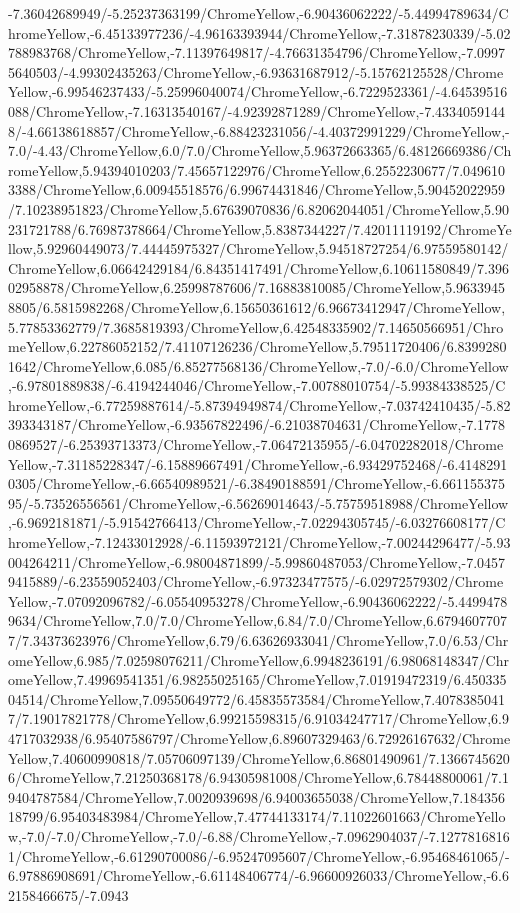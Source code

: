{\begin{tikzternal}
{-7.36042689949/-5.25237363199/ChromeYellow,-6.90436062222/-5.44994789634/ChromeYellow,-6.45133977236/-4.96163393944/ChromeYellow,-7.31878230339/-5.02788983768/ChromeYellow,-7.11397649817/-4.76631354796/ChromeYellow,-7.09975640503/-4.99302435263/ChromeYellow,-6.93631687912/-5.15762125528/ChromeYellow,-6.99546237433/-5.25996040074/ChromeYellow,-6.7229523361/-4.64539516088/ChromeYellow,-7.16313540167/-4.92392871289/ChromeYellow,-7.43340591448/-4.66138618857/ChromeYellow,-6.88423231056/-4.40372991229/ChromeYellow,-7.0/-4.43/ChromeYellow,6.0/7.0/ChromeYellow,5.96372663365/6.48126669386/ChromeYellow,5.94394010203/7.45657122976/ChromeYellow,6.2552230677/7.0496103388/ChromeYellow,6.00945518576/6.99674431846/ChromeYellow,5.90452022959/7.10238951823/ChromeYellow,5.67639070836/6.82062044051/ChromeYellow,5.90231721788/6.76987378664/ChromeYellow,5.8387344227/7.42011119192/ChromeYellow,5.92960449073/7.44445975327/ChromeYellow,5.94518727254/6.97559580142/ChromeYellow,6.06642429184/6.84351417491/ChromeYellow,6.10611580849/7.39602958878/ChromeYellow,6.25998787606/7.16883810085/ChromeYellow,5.96339458805/6.5815982268/ChromeYellow,6.15650361612/6.96673412947/ChromeYellow,5.77853362779/7.3685819393/ChromeYellow,6.42548335902/7.14650566951/ChromeYellow,6.22786052152/7.41107126236/ChromeYellow,5.79511720406/6.83992801642/ChromeYellow,6.085/6.85277568136/ChromeYellow,-7.0/-6.0/ChromeYellow,-6.97801889838/-6.4194244046/ChromeYellow,-7.00788010754/-5.99384338525/ChromeYellow,-6.77259887614/-5.87394949874/ChromeYellow,-7.03742410435/-5.82393343187/ChromeYellow,-6.93567822496/-6.21038704631/ChromeYellow,-7.17780869527/-6.25393713373/ChromeYellow,-7.06472135955/-6.04702282018/ChromeYellow,-7.31185228347/-6.15889667491/ChromeYellow,-6.93429752468/-6.41482910305/ChromeYellow,-6.66540989521/-6.38490188591/ChromeYellow,-6.66115537595/-5.73526556561/ChromeYellow,-6.56269014643/-5.75759518988/ChromeYellow,-6.9692181871/-5.91542766413/ChromeYellow,-7.02294305745/-6.03276608177/ChromeYellow,-7.12433012928/-6.11593972121/ChromeYellow,-7.00244296477/-5.93004264211/ChromeYellow,-6.98004871899/-5.99860487053/ChromeYellow,-7.04579415889/-6.23559052403/ChromeYellow,-6.97323477575/-6.02972579302/ChromeYellow,-7.07092096782/-6.05540953278/ChromeYellow,-6.90436062222/-5.44994789634/ChromeYellow,7.0/7.0/ChromeYellow,6.84/7.0/ChromeYellow,6.67946077077/7.34373623976/ChromeYellow,6.79/6.63626933041/ChromeYellow,7.0/6.53/ChromeYellow,6.985/7.02598076211/ChromeYellow,6.9948236191/6.98068148347/ChromeYellow,7.49969541351/6.98255025165/ChromeYellow,7.01919472319/6.45033504514/ChromeYellow,7.09550649772/6.45835573584/ChromeYellow,7.40783850417/7.19017821778/ChromeYellow,6.99215598315/6.91034247717/ChromeYellow,6.94717032938/6.95407586797/ChromeYellow,6.89607329463/6.72926167632/ChromeYellow,7.40600990818/7.05706097139/ChromeYellow,6.86801490961/7.13667456206/ChromeYellow,7.21250368178/6.94305981008/ChromeYellow,6.78448800061/7.19404787584/ChromeYellow,7.0020939698/6.94003655038/ChromeYellow,7.18435618799/6.95403483984/ChromeYellow,7.47744133174/7.11022601663/ChromeYellow,-7.0/-7.0/ChromeYellow,-7.0/-6.88/ChromeYellow,-7.0962904037/-7.12778168161/ChromeYellow,-6.61290700086/-6.95247095607/ChromeYellow,-6.95468461065/-6.97886908691/ChromeYellow,-6.61148406774/-6.96600926033/ChromeYellow,-6.62158466675/-7.0943}
\end{tikzternal}}
